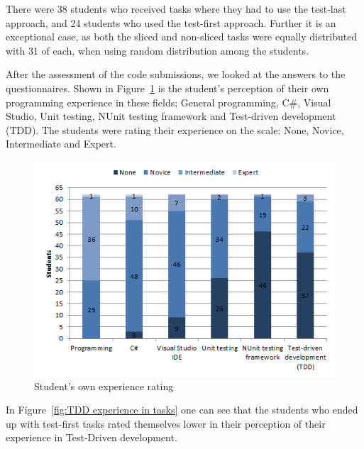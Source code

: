 \documentclass{sig-alternate-05-2015}
\begin{document}
There were 38 students who received tasks where they had to use the test-last approach, and 24 students who used the test-first approach. Further it is an exceptional case, as both the sliced and non-sliced tasks were equally distributed with 31 of each, when using random distribution among the students.

After the assessment of the code submissions, we looked at the answers to the questionnaires. Shown in Figure~\ref{fig:Student's own experience rating} is the student's perception of their own programming experience in these fields; General programming, C{\#}, Visual Studio, Unit testing, NUnit testing framework and Test-driven development (TDD).
The students were rating their experience on the scale: None, Novice, Intermediate and Expert.

\begin{figure}[!ht]
	\centering
	\includegraphics[width=1\linewidth]{img03}
	\caption{Student's own experience rating}
	\label{fig:Student's own experience rating}
\end{figure}

In Figure~\ref{fig:TDD experience in tasks} one can see that the students who ended up with test-first tasks rated themselves lower in their perception of their experience in Test-Driven development.
\end{document}
